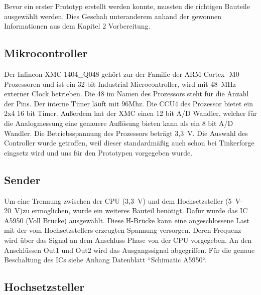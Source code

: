 Bevor ein erster Prototyp erstellt werden konnte, mussten die richtigen Bauteile ausgewählt werden. Dies Geschah unteranderem anhand der gewonnen Informationen aus dem Kapitel 2 Vorbereitung. 

\subsection{Mikrocontroller}
Der Infineon XMC 1404\_Q048 gehört zur der Familie der ARM Cortex -M0 Prozessoren und ist ein 32-bit Industrial Microcontroller, wird mit 48~MHz externer Clock betrieben. Die 48 im Namen des Prozessors steht für die Anzahl der Pins. Der interne Timer läuft mit 96Mhz. Die CCU4 des Prozessor bietet ein 2x4 16 bit Timer. Außerdem hat der XMC einen 12 bit A/D Wandler, welcher für die Analogmessung eine genauere Auflösung bieten kann als ein 8 bit A/D Wandler. Die Betriebsspannung des Prozessors beträgt 3,3~V. Die Auswahl des Controller wurde getroffen, weil dieser standardmäßig auch schon bei Tinkerforge eingsetz wird und uns für den Prototypen vorgegeben wurde. 


\subsection{Sender}
Um eine Trennung zwischen der CPU (3,3~V) und dem Hochsetzsteller (5~V-20~V)zu ermöglichen, wurde ein weiteres Bauteil benötigt. Dafür wurde das IC A5950 (Voll Brücke) ausgewählt. Diese H-Brücke kann eine angeschlossene Last mit der vom Hochsetzstellers erzeugten Spannung versorgen. Deren Frequenz wird über das Signal an dem Anschluss Phase von der CPU vorgegeben. An den Anschlüssen Out1 und Out2 wird das Ausgangssignal abgegriffen. Für die genaue Beschaltung des ICs siehe Anhang Datenblatt “Schimatic A5950“.


\subsection{Hochsetzsteller}


